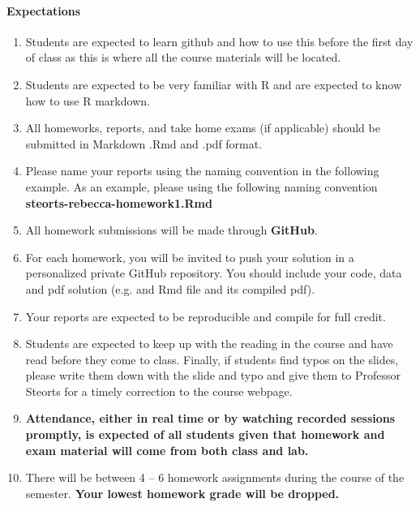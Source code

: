 \documentclass[11pt]{article}
\begin{document}

\newpage
\paragraph{Expectations}
\begin{enumerate}
\item Students are expected to learn github and how to use this before the first day of class as this is where all the course materials will be located.
\item Students are expected to be very familiar with R and are expected to know how to use R markdown.
\item All homeworks, reports, and take home exams (if applicable) should be submitted in Markdown .Rmd and .pdf format.
\item Please name your reports using the naming convention in the following example. As an example, please using the following naming convention \textbf{steorts-rebecca-homework1.Rmd}
\item All homework submissions will be made through \textbf{GitHub}.
\item For each homework, you will be invited to push your solution in a personalized private GitHub repository. You should include your code, data and pdf solution (e.g. and Rmd file and its compiled pdf).
\item Your reports are expected to be reproducible and compile for full credit.
\item Students are expected to keep up with the reading in the course and have read before they come to class. Finally, if students find typos on the slides, please write them down with the slide and typo and give them to Professor Steorts for a timely correction to the course webpage.
\item \textbf{Attendance, either in real time or by watching recorded sessions promptly, is expected of all students given that homework and exam material will come from both class and lab.}
\item There will be between 4 -- 6 homework assignments during the course of the semester. \textbf{Your lowest homework grade will be dropped.}
\end{enumerate}
\end{document}
